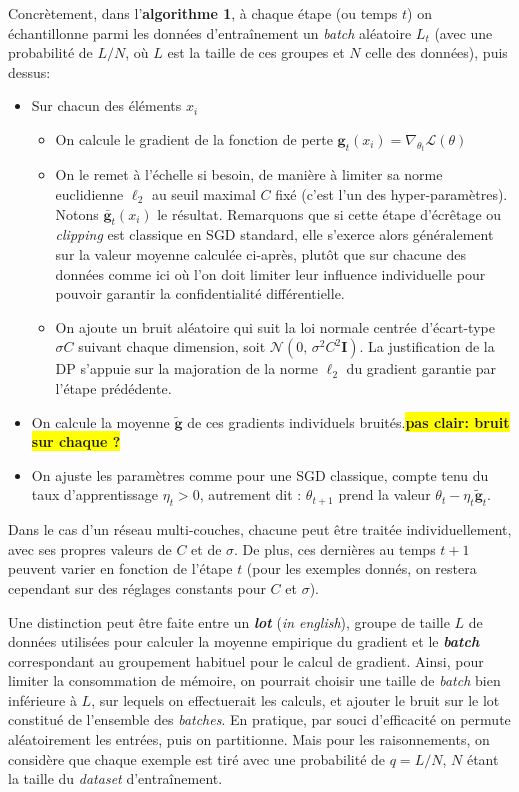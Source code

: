 \documentclass[a4paper,11pt]{article} %
\newcommand{\rem}[1]{\colorbox{yellow}{\textbf{#1}}}
\newcommand{\evid}[1]{\colorbox{blue!10}{\textbf{#1}}}
\begin{document}
Concrètement, dans l'\textbf{algorithme 1}, à chaque étape (ou temps $t$) on échantillonne parmi les données d'entraînement un \emph{batch} aléatoire $L_t$ (avec une probabilité de $L/N$, où $L$ est la taille de ces groupes et $N$ celle des données), puis dessus:
\begin{itemize}
   \item
   Sur chacun des éléments $x_i$
   \begin{itemize}
       \item
       On calcule le gradient de la fonction de perte $\mathbf{g}_t(x_i) = \nabla_{\theta_t } \mathcal{L}(\theta)$
       \item
       On le remet à l'échelle si besoin, de manière à limiter sa norme  euclidienne $\ell_2$ au seuil maximal $C$ fixé (c'est l'un des hyper-paramètres). Notons $\bar{\mathbf{g}}_t(x_i)$ le résultat. Remarquons que si cette étape d'écrêtage ou \emph{clipping}  est classique en SGD standard, elle s'exerce alors généralement sur la valeur moyenne calculée ci-après, plutôt que sur  chacune des données comme ici où l'on doit limiter leur influence individuelle pour pouvoir garantir la confidentialité différentielle.
       \item
       On ajoute un bruit aléatoire qui suit la loi normale centrée d'écart-type $\sigma C$ suivant chaque dimension, soit  $\mathcal{N}(0,\, \sigma^2 C^2 \mathbf{I})$. La justification de la DP s'appuie sur la majoration de la norme $\ell_2$ du gradient garantie par l'étape prédédente.
   \end{itemize}
   \item
   On calcule la moyenne $\tilde{\mathbf{g}}$ de ces gradients individuels bruités.\rem{pas clair: bruit sur chaque ?}
   \item
   On ajuste les paramètres comme pour une SGD classique, compte tenu du taux d'apprentissage $\eta_t>0$, autrement dit : $\theta_{t+1}$ prend la valeur $\theta_t - \eta_t \tilde{\mathbf{g}}_t$.
\end{itemize}

Dans le cas d'un réseau multi-couches, chacune peut être traitée individuellement, avec ses propres valeurs de $C$ et de $\sigma$. De plus, ces dernières au temps $t+1$ peuvent varier en fonction de l'étape $t$ (pour les exemples donnés, on restera cependant sur des réglages constants pour $C$ et $\sigma$).

Une distinction peut être faite entre un \evid{\emph{lot}} (\emph{in english}), groupe de taille $L$ de données utilisées pour calculer la moyenne empirique du gradient et le \evid{\emph{batch}} correspondant au groupement habituel pour le calcul de gradient. Ainsi, pour limiter la consommation de mémoire, on pourrait choisir une taille de \emph{batch} bien inférieure à $L$, sur lequels on effectuerait les calculs, et ajouter le bruit sur le lot constitué de l'ensemble des \emph{batches}. En pratique, par souci d'efficacité on permute aléatoirement les entrées, puis on partitionne. Mais pour les raisonnements, on considère que chaque exemple est tiré avec une probabilité de $q=L/N$, $N$ étant la taille du \emph{dataset} d'entraînement.
%
\end{document}
